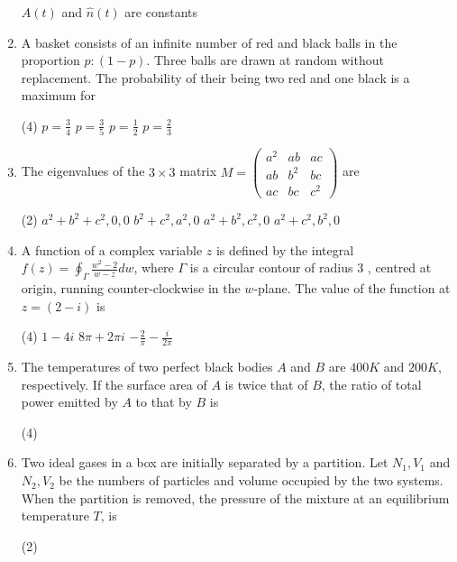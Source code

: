 \begin{enumerate}
\begin{tasks}
	\task[\textbf{d.}] $A(t)$ and $\hat{n}(t)$ are constants
\end{tasks}
\item A basket consists of an infinite number of red and black balls in the proportion $p:(1-p)$. Three balls are drawn at random without replacement. The probability of their being two red and one black is a maximum for
 \begin{tasks}(4)
	\task[\textbf{a.}]$p=\frac{3}{4}$
	\task[\textbf{b.}]$p=\frac{3}{5}$
	\task[\textbf{c.}] $p=\frac{1}{2}$
	\task[\textbf{d.}] $p=\frac{2}{3}$ 
\end{tasks}
\item The eigenvalues of the $3 \times 3$ matrix $M=\left(\begin{array}{lll}a^{2} & a b & a c \\ a b & b^{2} & b c \\ a c & b c & c^{2}\end{array}\right)$ are
 \begin{tasks}(2)
	\task[\textbf{a.}]$a^{2}+b^{2}+c^{2}, 0,0$
	\task[\textbf{b.}]$b^{2}+c^{2}, a^{2}, 0$
	\task[\textbf{c.}]$a^{2}+b^{2}, c^{2}, 0$
	\task[\textbf{d.}]$a^{2}+c^{2}, b^{2}, 0$	 
\end{tasks}
\item  A function of a complex variable $z$ is defined by the integral $f(z)=\oint_{\Gamma} \frac{w^{2}-2}{w-z} d w$, where $\Gamma$ is a circular contour of radius 3 , centred at origin, running counter-clockwise in the $w$-plane. The value of the function at $z=(2-i)$ is
 \begin{tasks}(4)
	\task[\textbf{b.}]$1-4 i$
	\task[\textbf{c.}]$8 \pi+2 \pi i$
	\task[\textbf{d.}]$-\frac{2}{\pi}-\frac{i}{2 \pi}$ 
\end{tasks}	
\item  The temperatures of two perfect black bodies $A$ and $B$ are $400 K$ and $200 K$, respectively. If the surface area of $A$ is twice that of $B$, the ratio of total power emitted by $A$ to that by $B$ is
 \begin{tasks}(4)
\end{tasks}
\item Two ideal gases in a box are initially separated by a partition. Let $N_{1}, V_{1}$ and $N_{2}, V_{2}$ be the numbers of particles and volume occupied by the two systems. When the partition is removed, the pressure of the mixture at an equilibrium temperature $T$, is
 \begin{tasks}(2)

\end{tasks}
\end{enumerate}

